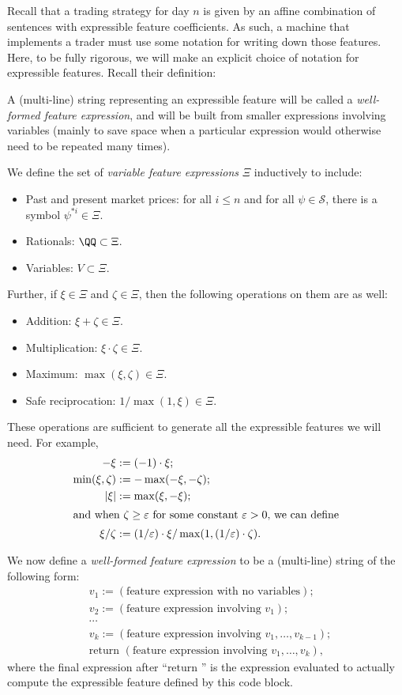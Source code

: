 \documentclass[authordate,onecolumn,noenvironments]{miri-tech-article}
\numberwithin{equation}{subsection}
\newcommand{\nn}{n}
\newcommand{\Sentences}{\mathcal{S}}
\newcommand{\returntrade}{\textrm{return }}
\begin{document}
Recall that a trading strategy for day $\nn$ is given by an affine combination of sentences with expressible feature coefficients.  As such, a machine that implements a trader must use some notation for writing down those features.  Here, to be fully rigorous, we will make an explicit choice of notation for expressible features.  Recall their definition:

\expressiblefeatures*

A (multi-line) string representing an expressible feature will be called a \emph{well-formed feature expression}, and will be built from smaller expressions  involving variables (mainly to save space when a particular expression would otherwise need to be repeated many times).

We define the set of \emph{variable feature expressions} $\Xi$ inductively to include:
%
\begin{itemize}
\item Past and present market prices: for all $i \leq n$ and for all $\psi\in\Sentences$, there is a symbol $\psi^{* i}\in\Xi$.
\item Rationals: $\QQ \subset \Xi$. 
\item Variables: $V \subset \Xi$. 
\end{itemize}
%
Further, if $\xi\in\Xi$ and $\zeta\in\Xi$, then the following operations on them are as well:
\begin{itemize}
\item 
Addition: $\xi + \zeta\in\Xi$.
\item 
Multiplication: $\xi \cdot \zeta\in\Xi$.
\item 
Maximum: $\max(\xi, \zeta)\in\Xi$.
\item
Safe reciprocation: $1/\max(1,\xi)\in\Xi$.
\end{itemize}
%
These operations are sufficient to generate all the expressible features we will need. For example, 
%
\begin{align*}
-\xi &:= (-1)\cdot \xi;\\
\min(\xi,\zeta) &:= -\max(-\xi,-\zeta);\\
|\xi|&:= \max(\xi,-\xi);\\
\intertext{and when $\zeta \geq \varepsilon$ for some constant $\varepsilon > 0$, we can define}
\xi/\zeta &:= (1/\varepsilon) \cdot \xi/\max(1,  (1/\varepsilon) \cdot \zeta ).
\end{align*}

\noindent We now define a \emph{well-formed feature expression} to be a (multi-line) string of the following form:
%
\begin{align*}
&v_1 := (\text{feature expression with no variables});\\
&v_2 := (\text{feature expression involving $v_1$});\\
&\cdots\\
&v_k := (\text{feature expression involving $v_1,\ldots,v_{k-1}$});\\
&\returntrade (\text{feature expression involving $v_1,\ldots,v_k$}),
\end{align*}
\noindent where the final expression after ``$ \returntrade$'' is the expression evaluated to actually compute the expressible feature defined by this code block.
\end{document}
